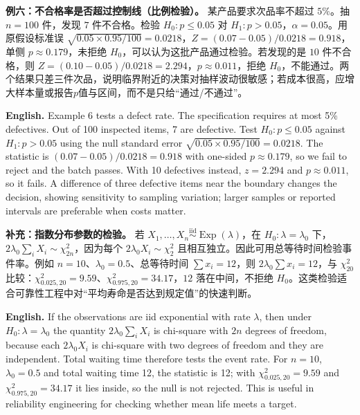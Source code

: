 \documentclass[UTF8,11pt,a4paper]{ctexart}
\newcommand{\EN}[1]{\par\noindent\textbf{English.} #1\par}
\begin{document}
\noindent\textbf{例六：不合格率是否超过控制线（比例检验）。}
某产品要求次品率不超过 $5\%$。抽 $n=100$ 件，发现 $7$ 件不合格。检验 $H_0:p\le0.05$ 对 $H_1:p>0.05$，$\alpha=0.05$。用原假设标准误 $\sqrt{0.05\times0.95/100}=0.0218$，$Z=(0.07-0.05)/0.0218=0.918$，单侧 $p\approx0.179$，未拒绝 $H_0$，可以认为这批产品通过检验。若发现的是 $10$ 件不合格，则 $Z=(0.10-0.05)/0.0218=2.294$，$p\approx0.011$，拒绝 $H_0$，不能通过。两个结果只差三件次品，说明临界附近的决策对抽样波动很敏感；若成本很高，应增大样本量或报告$p$值与区间，而不是只给“通过/不通过”。
\EN{Example 6 tests a defect rate. The specification requires at most 5\% defectives. Out of 100 inspected items, 7 are defective. Test $H_0:p\le0.05$ against $H_1:p>0.05$ using the null standard error $\sqrt{0.05\times0.95/100}=0.0218$. The statistic is $(0.07-0.05)/0.0218=0.918$ with one-sided $p\approx0.179$, so we fail to reject and the batch passes. With 10 defectives instead, $z=2.294$ and $p\approx0.011$, so it fails. A difference of three defective items near the boundary changes the decision, showing sensitivity to sampling variation; larger samples or reported intervals are preferable when costs matter.}

\noindent\textbf{补充：指数分布参数的检验。} 若 $X_1,\ldots,X_n\overset{\mathrm{iid}}\sim\operatorname{Exp}(\lambda)$，在 $H_0:\lambda=\lambda_0$ 下，$2\lambda_0\sum_iX_i\sim\chi^2_{2n}$，因为每个 $2\lambda_0X_i\sim\chi^2_2$ 且相互独立。因此可用总等待时间检验事件率。例如 $n=10$、$\lambda_0=0.5$、总等待时间 $\sum x_i=12$，则 $2\lambda_0\sum x_i=12$，与 $\chi^2_{20}$ 比较：$\chi^2_{0.025,20}=9.59$、$\chi^2_{0.975,20}=34.17$，$12$ 落在中间，不拒绝 $H_0$。这类检验适合可靠性工程中对“平均寿命是否达到规定值”的快速判断。
\EN{If the observations are iid exponential with rate $\lambda$, then under $H_0:\lambda=\lambda_0$ the quantity $2\lambda_0\sum_iX_i$ is chi-square with $2n$ degrees of freedom, because each $2\lambda_0X_i$ is chi-square with two degrees of freedom and they are independent. Total waiting time therefore tests the event rate. For $n=10$, $\lambda_0=0.5$ and total waiting time 12, the statistic is 12; with $\chi^2_{0.025,20}=9.59$ and $\chi^2_{0.975,20}=34.17$ it lies inside, so the null is not rejected. This is useful in reliability engineering for checking whether mean life meets a target.}
\end{document}
